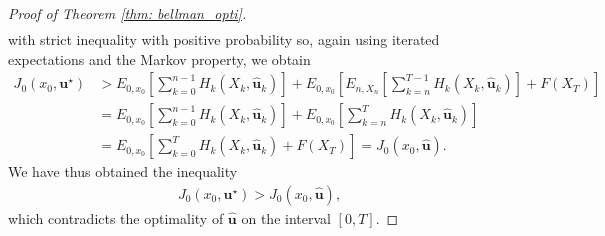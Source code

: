 \documentclass[\topdir/lecture\_notes.tex]{subfiles}
\begin{document}
\begin{optional}
\begin{proof}[Proof of Theorem \ref{thm: bellman_opti}]
\begin{align*}
\end{align*}
with strict inequality with positive probability so, again using iterated expectations and the Markov property, we obtain
\begin{align*}
J_{0}(x_{0}, \mathbf{u}^{\star}) & >E_{0, x_{0}}\left[\sum_{k=0}^{n-1} H_{k}(X_{k}, \hat{\mathbf{u}}_{k})\right]+E_{0, x_{0}}\left[E_{n, X_{n}}\left[\sum_{k=n}^{T-1} H_{k}(X_{k}, \hat{\mathbf{u}}_{k})\right]+F(X_{T})\right] \\
& =E_{0, x_{0}}\left[\sum_{k=0}^{n-1} H_{k}(X_{k}, \hat{\mathbf{u}}_{k})\right]+E_{0, x_{0}}\left[\sum_{k=n}^{T} H_{k}(X_{k}, \hat{\mathbf{u}}_{k})\right] \\
& =E_{0, x_{0}}\left[\sum_{k=0}^{T} H_{k}(X_{k}, \hat{\mathbf{u}}_{k})+F(X_{T})\right]=J_{0}(x_{0}, \hat{\mathbf{u}}).
\end{align*}
We have thus obtained the inequality
\begin{align*}
J_{0}(x_{0}, \mathbf{u}^{\star})>J_{0}(x_{0}, \hat{\mathbf{u}}),
\end{align*}
which contradicts the optimality of $\hat{\mathbf{u}}$ on the interval $[0, T]$.
\end{proof}


\end{optional}
\end{document}
